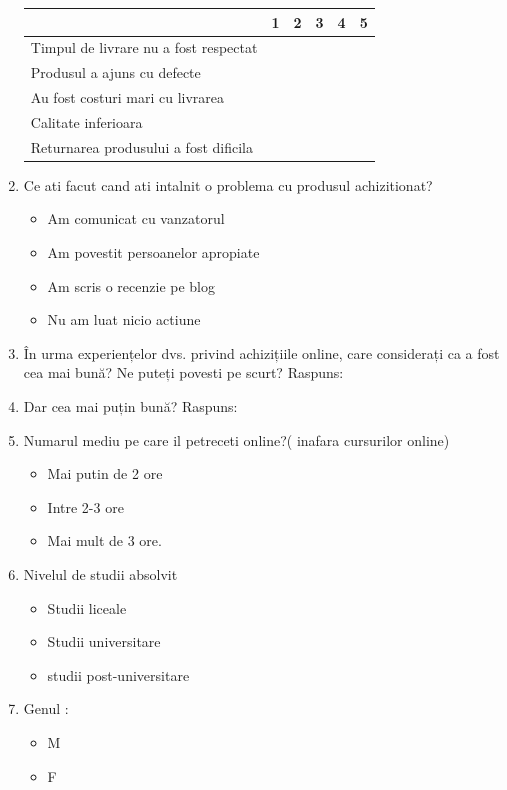 \documentclass[a4paper, 12pt]{article}
\begin{document}
\begin{enumerate}
\begin{center}
		\begin{tabular}{ | m{19em} | m{1cm}| m{1cm} | m{1cm}| m{1cm} | m{1cm} |} 
			\hline
			& 1 & 2 & 3 & 4 & 5\\ 
			\hline
			Timpul de livrare nu a fost respectat  &  &  &  & & \\ 
			\hline
			Produsul a ajuns cu defecte &  &   &  &  &\\ 
			\hline
			Au fost costuri mari cu livrarea &  &   &  & & \\ 
			\hline
			Calitate inferioara&  &  &  & & \\ 
			\hline
			Returnarea produsului a fost dificila &  &  &  & & \\
			\hline
		\end{tabular}
	\end{center}
	\item Ce ati facut cand ati intalnit o problema cu produsul achizitionat?
	\begin{itemize}
		\item Am comunicat cu vanzatorul
		\item Am povestit persoanelor apropiate
		\item Am scris o recenzie pe blog
		\item Nu am luat nicio actiune
	\end{itemize}
	\item În urma experiențelor dvs.  privind achizițiile online, care considerați ca a fost cea mai bună? Ne puteți povesti pe scurt?
	\newline Raspuns: 
	\item Dar cea mai puțin bună?
	\newline Raspuns:
	\item	Numarul mediu pe care il petreceti online?( inafara cursurilor online) 
	\begin{itemize}
		\item Mai putin de 2 ore
		\item Intre 2-3 ore
		\item Mai mult de 3 ore.
	\end{itemize}
	\item 	Nivelul de studii absolvit
	\begin{itemize}
		\item Studii liceale
		\item Studii universitare
		\item studii post-universitare
	\end{itemize}
	\item 	Genul :
	\begin{itemize}
		\item M
		\item F
	\end{itemize} 
\end{enumerate}

	
\end{document}
